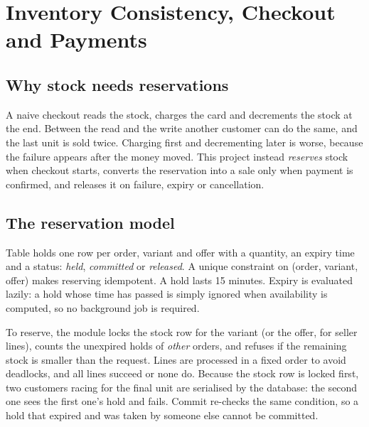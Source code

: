 \chapter{Inventory Consistency, Checkout and Payments}
\label{ch:inventory}

\section{Why stock needs reservations}

A naive checkout reads the stock, charges the card and decrements the stock at the end. Between the read and the write another customer can do the same, and the last unit is sold twice. Charging first and decrementing later is worse, because the failure appears after the money moved. This project instead \emph{reserves} stock when checkout starts, converts the reservation into a sale only when payment is confirmed, and releases it on failure, expiry or cancellation.

\section{The reservation model}

Table  holds one row per order, variant and offer with a quantity, an expiry time and a status: \emph{held}, \emph{committed} or \emph{released}. A unique constraint on (order, variant, offer) makes reserving idempotent. A hold lasts 15 minutes. Expiry is evaluated lazily: a hold whose time has passed is simply ignored when availability is computed, so no background job is required. \tagimpl{}

To reserve, the module locks the stock row for the variant (or the offer, for seller lines), counts the unexpired holds of \emph{other} orders, and refuses if the remaining stock is smaller than the request. Lines are processed in a fixed order to avoid deadlocks, and all lines succeed or none do. Because the stock row is locked first, two customers racing for the final unit are serialised by the database: the second one sees the first one's hold and fails. Commit re-checks the same condition, so a hold that expired and was taken by someone else cannot be committed. \tagtest{}

